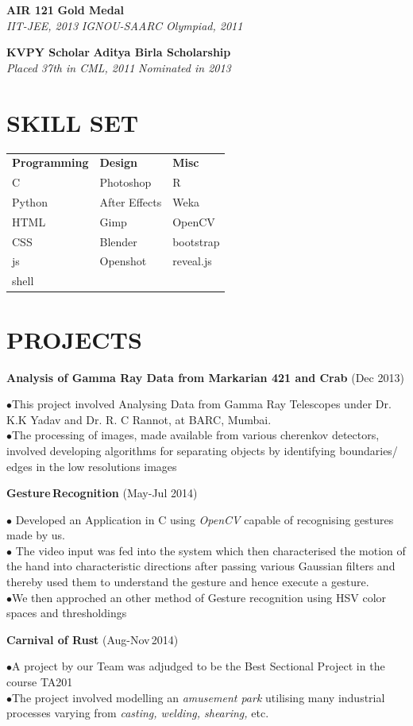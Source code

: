 \documentclass{article}
\newcommand{\sepspace}{\vspace*{0.8em}}
\newcommand{\NewPart}[1]{\section*{\uppercase{#1}}}
\newcommand{\SkillsEntry}[3]{#1 & #2 & #3\\}
\newcommand{\ScholasticAcheivements}[4]{
		\noindent \textbf{#1} \hfill \textbf{#2} \\
		\textit{#3}	 \hfill	 \textit{ #4} 	
		\normalsize \par
		}
\newcommand{\WorkEntry}[3]{						
		\noindent \textbf{#1} \hfill 					
		(#2) \par		
		\noindent #3 \par					
		}
\begin{document}
\ScholasticAcheivements{AIR 121}{Gold Medal}{IIT-JEE, 2013}{IGNOU-SAARC Olympiad, 2011}

\sepspace

\ScholasticAcheivements{KVPY Scholar}{Aditya Birla Scholarship}{Placed 37th in CML, 2011}{Nominated in 2013}
\NewPart{Skill Set}
	\begin{tabular}{m{}  m{} m{}}
		\SkillsEntry{\textbf{Programming}}{\textbf{Design}}{\textbf{Misc}}
		\SkillsEntry{C}{Photoshop}{R}
		\SkillsEntry{Python}{After Effects}{Weka}
		\SkillsEntry{HTML}{Gimp}{OpenCV}
		\SkillsEntry{CSS}{Blender}{bootstrap}
		\SkillsEntry{js}{Openshot}{reveal.js}
		\SkillsEntry{shell}{}{}
	\end{tabular}
\NewPart{Projects}
\WorkEntry{Analysis of Gamma Ray Data from Markarian 421 and Crab}{Dec 2013}{$\bullet$This project involved Analysing Data from Gamma Ray Telescopes under Dr. K.K Yadav and Dr. R. C Rannot, at BARC, Mumbai.\\$\bullet$The processing of images, made available from various cherenkov detectors, involved developing algorithms for separating objects by identifying boundaries/ edges in the low resolutions images}
\pagebreak
\WorkEntry{Gesture\,Recognition}{May-Jul 2014}{$\bullet$ Developed an Application in C using \emph{OpenCV} capable of recognising gestures made by us.\\ $\bullet$ The video input was fed into the system which then characterised the motion of the hand into characteristic
directions after passing various Gaussian filters and thereby used them to understand the gesture and
hence execute a gesture.\\$\bullet$We then approched an other method of Gesture recognition using HSV color spaces and thresholdings}
\sepspace
\WorkEntry{Carnival of Rust}{Aug-Nov\,2014}{$\bullet$A project by our Team was adjudged to be the Best Sectional Project in the course TA201\\$\bullet$The project involved modelling an \emph{amusement park} utilising many industrial processes varying from \emph{casting, welding, shearing,} etc.}
\end{document}
